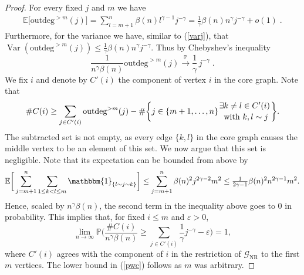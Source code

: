 \documentclass[12pt,a4paper]{article}
\newcommand{\Var}{\operatorname{Var}}
\numberwithin{equation}{section}
\begin{document}
\begin{proof}
For every fixed $j$ and $m$ we have
\begin{align*}
    \mathbb{E}\big[\text{outdeg}^{>m}(j)\big]=\sum_{l=m+1}^n \beta(n) l^{\gamma-1} j^{-\gamma} = \frac1\gamma \beta(n) n^\gamma j^{-\gamma} +o(1)\;.
\end{align*}
Furthermore, for the variance we have, similar to (\ref{varj}), that $\Var(\text{outdeg}^{>m}(j))\le\frac{1}{\gamma} \beta(n) n^\gamma j^{-\gamma} $.
Thus by Chebyshev's inequality
\begin{equation} \label{cheby}
     \frac1{n^\gamma \beta(n)}\text{outdeg}^{>m}(j) \overset{\mathbb P}{\longrightarrow} \frac{1}{\gamma}\, j^{-\gamma} \;.
\end{equation}
We fix $i$ and denote by $C'(i)$ the component of vertex $i$ in the core graph. Note that
\begin{align}\label{cge1}
  \# C(i) \geq \sum_{j\in C'(i)} \text{outdeg}^{>m}(j) - \# \bigg\{ j\in\{m+1,\ldots,n\}{ \exists k\not=l\in C'(i)\atop \text{ with } k,l\sim j}\bigg\}.  
\end{align}
The subtracted set is not empty, as every edge $\{k,l\}$ in the core graph causes the middle vertex to be an element of this set. We now argue that this set is negligible. Note that its expectation can be bounded from above by 
\begin{align}\label{cge2}
    \mathbb E\bigg[\sum_{j=m+1}^n\sum_{1\le k < l \le m} \mathbbm{1}_{\{l\sim j \sim k\}}\bigg ] \le \sum_{j=m+1}^n \beta(n)^2 j^{2\gamma-2 }m^2 \le \tfrac{1}{2\gamma-1}\beta(n)^2 n^{2\gamma-1 } m^2. %
\end{align}
Hence, scaled by $n^\gamma \beta(n)$, the second term in the inequality above goes to 0 in probability. This implies that, for fixed $i\le m$ and $\varepsilon>0$,
$$\lim_{n\to\infty} \mathbb P\Big( \frac{\# C(i)}{n^\gamma \beta(n)} \ge 
\sum_{j\in C'(i)}  \frac1\gamma j^{-\gamma}-\varepsilon \Big) = 1,$$
where $C'(i)$ agrees with the component  of $i$ in the restriction of
$\mathscr{G}_{\text{NR}}$ to the first $m$ vertices. The lower bound in (\ref{pwc}) follows as $m$ was arbitrary.\smallskip


\end{proof}
\end{document}
